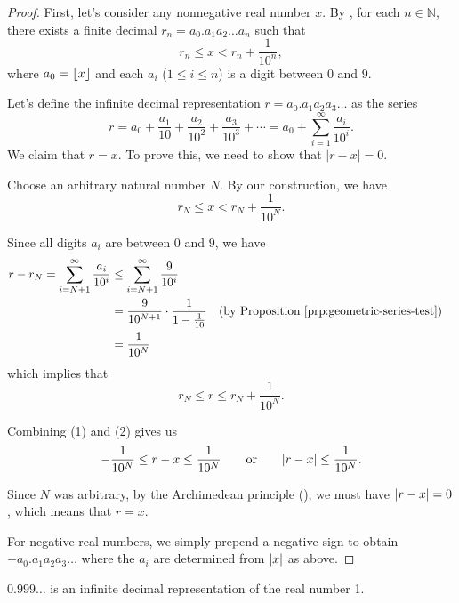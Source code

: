 \begin{proof}
  First, let's consider any nonnegative real number $x$. By
  , for each $n \in \mathbb{N}$,
  there exists a finite decimal $r_n = a_0.a_1a_2\ldots a_n$ such that
  \[ r_n \leq x < r_n + \frac{1}{10^n}, \]
  where $a_0 = \lfloor x \rfloor$ and each $a_i$ ($1 \leq i \leq n$) is a
  digit between $0$ and $9$.

  Let's define the infinite decimal representation $r = a_0.a_1 a_2
  a_3 \ldots$ as the series
  \[ r = a_0 + \frac{a_1}{10} + \frac{a_2}{10^2} + \frac{a_3}{10^3} +
  \cdots = a_0 + \sum_{i=1}^{\infty} \frac{a_i}{10^i}. \]
  We claim that $r = x$. To prove this, we need to show that $|r - x| = 0$.

  Choose an arbitrary natural number $N$. By our construction, we have
  \[ r_N \leq x < r_N + \frac{1}{10^N}. \tag{1} \]

  Since all digits $a_i$ are between $0$ and $9$, we have
  \begin{align*}
    r - r_N = \sum_{i=N+1}^{\infty} \frac{a_i}{10^i} & \leq
    \sum_{i=N+1}^{\infty} \frac{9}{10^i} \\
    & = \frac{9}{10^{N+1}} \cdot \frac{1}{1-\frac{1}{10}} &&
    \text{(by \prpref{geometric-series-test})} \\
    & = \frac{1}{10^N}
  \end{align*}
  which implies that
  \[ r_N \leq r \leq r_N + \frac{1}{10^N}. \tag{2} \]

  Combining (1) and (2) gives us
  \[ -\frac{1}{10^N} \leq r - x \leq \frac{1}{10^N} \qquad \text{or}
  \qquad | r - x | \leq \frac{1}{10^N}. \]

  Since $N$ was arbitrary, by the Archimedean principle
  (), we must have $| r - x | = 0$,
  which means that $r = x$.

  For negative real numbers, we simply prepend a negative sign to
  obtain $-a_0. a_1 a_2 a_3 \ldots$ where the $a_i$ are determined from
  $| x |$ as above.
\end{proof}

\begin{theorem}[$0.999\ldots = 1$]
  $0.999\ldots$ is an infinite decimal representation of the real number 1.
\end{theorem}

